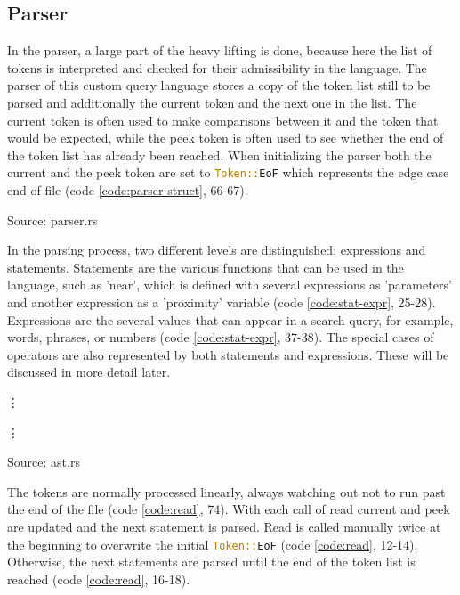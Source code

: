 \subsection{Parser}
In the parser, a large part of the heavy lifting is done, because here the list of tokens is interpreted and checked for their admissibility in the language. The parser of this custom query language stores a copy of the token list still to be parsed and additionally the current token and the next one in the list. The current token is often used to make comparisons between it and the token that would be expected, while the peek token is often used to see whether the end of the token list has already been reached. When initializing the parser both the current and the peek token are set to \lstinline[language=Rust]$Token::EoF$ which represents the edge case end of file (code \ref{code:parser-struct}, 66-67).
\begin{codeenv}
    \label{code:parser-struct}
    
    \centerline{Source: parser.rs}
\end{codeenv}
In the parsing process, two different levels are distinguished: expressions and statements. Statements are the various functions that can be used in the language, such as 'near', which is defined with several expressions as 'parameters' and another expression as a 'proximity' variable (code \ref{code:stat-expr}, 25-28). Expressions are the several values that can appear in a search query, for example, words, phrases, or numbers (code \ref{code:stat-expr}, 37-38). The special cases of operators are also represented by both statements and expressions. These will be discussed in more detail later.
\begin{codeenv}
    \label{code:stat-expr}
    
    \vdots
    
    \vdots
    
    \centerline{Source: ast.rs}
\end{codeenv}
The tokens are normally processed linearly, always watching out not to run past the end of the file (code \ref{code:read}, 74). With each call of read current and peek are updated and the next statement is parsed. Read is called manually twice at the beginning to overwrite the initial \lstinline[language=Rust]$Token::EoF$ (code \ref{code:read}, 12-14). Otherwise, the next statements are parsed until the end of the token list is reached (code \ref{code:read}, 16-18).

